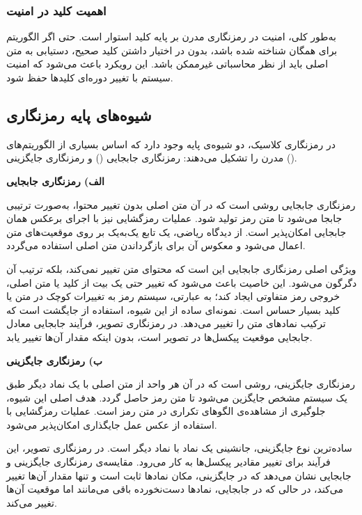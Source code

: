 \subsubsection{اهمیت کلید در امنیت}
به‌طور کلی، امنیت در رمزنگاری مدرن بر پایه کلید استوار است. حتی اگر الگوریتم برای همگان شناخته شده باشد، بدون در اختیار داشتن کلید صحیح، دستیابی به متن اصلی باید از نظر محاسباتی غیرممکن باشد. این رویکرد باعث می‌شود که امنیت سیستم با تغییر دوره‌ای کلیدها حفظ شود.

\subsection{شیوه‌های پایه رمزنگاری}
در رمزنگاری کلاسیک، دو شیوه‌ی پایه وجود دارد که اساس بسیاری از الگوریتم‌های مدرن را تشکیل می‌دهند: رمزنگاری جابجایی () و رمزنگاری جایگزینی ()\cite{ref22}.

\textbf{الف) رمزنگاری جابجایی}

رمزنگاری جابجایی روشی است که در آن متن اصلی بدون تغییر محتوا، به‌صورت ترتیبی جابجا می‌شود تا متن رمز تولید شود. عملیات رمزگشایی نیز با اجرای برعکس همان جابجایی امکان‌پذیر است. از دیدگاه ریاضی، یک تابع یک‌به‌یک بر روی موقعیت‌های متن اعمال می‌شود و معکوس آن برای بازگرداندن متن اصلی استفاده می‌گردد.

ویژگی اصلی رمزنگاری جابجایی این است که محتوای متن تغییر نمی‌کند، بلکه ترتیب آن دگرگون می‌شود. این خاصیت باعث می‌شود که تغییر حتی یک بیت از کلید یا متن اصلی، خروجی رمز متفاوتی ایجاد کند؛ به عبارتی، سیستم رمز به تغییرات کوچک در متن یا کلید بسیار حساس است. نمونه‌ای ساده از این شیوه، استفاده از جایگشت است که ترکیب نمادهای متن را تغییر می‌دهد. در رمزنگاری تصویر، فرآیند جابجایی معادل جابجایی موقعیت پیکسل‌ها در تصویر است، بدون اینکه مقدار آن‌ها تغییر یابد\cite{ref23}.

\textbf{ب) رمزنگاری جایگزینی}

رمزنگاری جایگزینی، روشی است که در آن هر واحد از متن اصلی با یک نماد دیگر طبق یک سیستم مشخص جایگزین می‌شود تا متن رمز حاصل گردد. هدف اصلی این شیوه، جلوگیری از مشاهده‌ی الگوهای تکراری در متن رمز است. عملیات رمزگشایی با استفاده از عکس عمل جایگذاری امکان‌پذیر می‌شود.

ساده‌ترین نوع جایگزینی، جانشینی یک نماد با نماد دیگر است. در رمزنگاری تصویر، این فرآیند برای تغییر مقادیر پیکسل‌ها به کار می‌رود. مقایسه‌ی رمزنگاری جایگزینی و جابجایی نشان می‌دهد که در جایگزینی، مکان نمادها ثابت است و تنها مقدار آن‌ها تغییر می‌کند، در حالی که در جابجایی، نمادها دست‌نخورده باقی می‌مانند اما موقعیت آن‌ها تغییر می‌کند\cite{ref22, ref24}.

